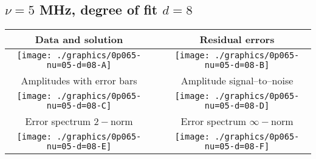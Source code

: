 

% 

\clearpage{}
\break{}

\subsection{$\nu = 5$ MHz, degree of fit $d = 8$}

\begin{table}[h]
    \begin{center}
        \begin{tabular}{ccc}
            Data and solution & \quad & Residual errors \\\hline
            \texttt{[image: ./graphics/0p065-nu=05-d=08-A]} &&
            \texttt{[image: ./graphics/0p065-nu=05-d=08-B]} \\[15pt]
            Amplitudes with error bars && Amplitude signal--to--noise \\\hline
            \texttt{[image: ./graphics/0p065-nu=05-d=08-C]} &&
            \texttt{[image: ./graphics/0p065-nu=05-d=08-D]} \\[15pt]
            Error spectrum $2-$norm && Error spectrum $\infty-$norm \\\hline
            \texttt{[image: ./graphics/0p065-nu=05-d=08-E]} &&
            \texttt{[image: ./graphics/0p065-nu=05-d=08-F]} \\[15pt]
        \end{tabular}
    \end{center}
\label{fig:elev=65, nu=5}
\end{table}



\endinput
